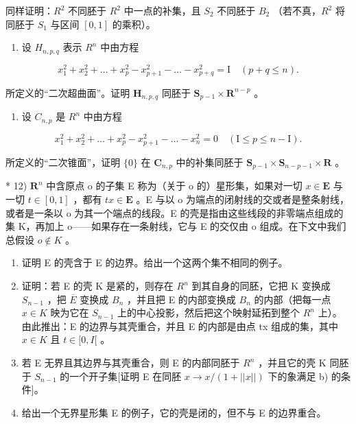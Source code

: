 同样证明：\(R^{2}\) 不同胚于 \(R^{2}\) 中一点的补集，且 \(S_{2}\) 不同胚于 \(B_{2}\) （若不真，\(R^{2}\) 将同胚于 \(S_{1}\) 与区间 \([0, 1]\) 的乘积）。

\begin{enumerate}
\def\labelenumi{\arabic{enumi})}
\setcounter{enumi}{9}
\tightlist
\item
  设 \(H_{n,p,q}\) 表示 \(R^{n}\) 中由方程
\end{enumerate}

\[
x _ {1} ^ {2} + x _ {2} ^ {2} + \dots + x _ {p} ^ {2} - x _ {p + 1} ^ {2} - \dots - x _ {p + q} ^ {2} = \mathrm{I} \quad (p + q \leqslant n).
\]

所定义的“二次超曲面”。证明 \(\mathbf{H}_{n,p,q}\) 同胚于 \(\mathbf{S}_{p - 1}\times \mathbf{R}^{n - p}\) 。

\begin{enumerate}
\def\labelenumi{\arabic{enumi})}
\setcounter{enumi}{10}
\tightlist
\item
  设 \(C_{n,p}\) 是 \(R^{n}\) 中由方程
\end{enumerate}

\[
x _ {1} ^ {2} + x _ {2} ^ {2} + \dots + x _ {p} ^ {2} - x _ {p + 1} ^ {2} - \dots - x _ {n} ^ {2} = 0 \quad (\mathrm{I} \leqslant p \leqslant n - \mathrm{I}).
\]

所定义的“二次锥面”，证明 \(\{0\}\) 在 \(\mathbf{C}_{n,p}\) 中的补集同胚于 \(\mathbf{S}_{p-1} \times \mathbf{S}_{n-p-1} \times \mathbf{R}\) 。

* 12) \(\mathbf{R}^n\) 中含原点 o 的子集 E 称为（关于 o 的）星形集，如果对一切 \(x \in \mathbf{E}\) 与一切 \(t \in [0, 1]\) ，都有 \(tx \in \mathbf{E}\) 。E 与以 o 为端点的闭射线的交或者是整条射线，或者是一条以 o 为其一个端点的线段。E 的壳是指由这些线段的非零端点组成的集 K，再加上 o——如果存在一条射线，它与 E 的交仅由 o 组成。在下文中我们总假设 \(o \notin K\) 。

\begin{enumerate}
\def\labelenumi{\alph{enumi})}
\item
  证明 E 的壳含于 E 的边界。给出一个这两个集不相同的例子。
\item
  证明：若 E 的壳 K 是紧的，则存在 \(R^{n}\) 到其自身的同胚，它把 K 变换成 \(S_{n-1}\) ，把 \(\overline{E}\) 变换成 \(B_{n}\) ，并且把 E 的内部变换成 \(B_{n}\) 的内部（把每一点 \(x \in K\) 映为它在 \(S_{n-1}\) 上的中心投影，然后把这个映射延拓到整个 \(R^{n}\) 上）。由此推出：E 的边界与其壳重合，并且 E 的内部是由点 tx 组成的集，其中 \(x \in K\) 且 \(t \in [0, I[\) 。
\item
  若 E 无界且其边界与其壳重合，则 E 的内部同胚于 \(R^{n}\) ，并且它的壳 K 同胚于 \(S_{n-1}\) 的一个开子集{[}证明 E 在同胚 \(x \to x/(1 + ||x||)\) 下的象满足 b) 的条件{]}。
\item
  给出一个无界星形集 E 的例子，它的壳是闭的，但不与 E 的边界重合。
\end{enumerate}

